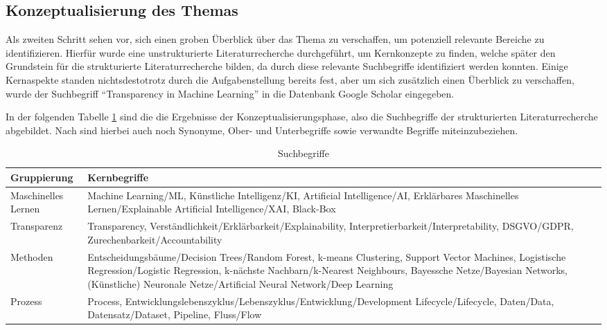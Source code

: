 \subsection{Konzeptualisierung des Themas}
\label{chap:Konzeptualisierung}
Als zweiten Schritt sehen \cite{vom_Brooke_2009} vor, sich einen groben Überblick über das Thema zu verschaffen, um potenziell relevante Bereiche zu identifizieren. Hierfür wurde eine unstrukturierte Literaturrecherche durchgeführt, um Kernkonzepte zu finden, welche später den Grundstein für die strukturierte Literaturrecherche bilden, da durch diese relevante Suchbegriffe identifiziert werden konnten. Einige Kernaspekte standen nichtsdestotrotz durch die Aufgabenstellung bereits fest, aber um sich zusätzlich einen Überblick zu verschaffen, wurde der Suchbegriff \enquote{Transparency in Machine Learning} in die Datenbank Google Scholar eingegeben. 

In der folgenden Tabelle \ref{tab:suchbegriffe} sind die die Ergebnisse der Konzeptualisierungsphase, also die Suchbegriffe der strukturierten Literaturrecherche abgebildet. Nach \cite{Brink.2013} sind hierbei auch noch Synonyme, Ober- und Unterbegriffe sowie verwandte Begriffe miteinzubeziehen.

\begin{table}[!h]
\begin{tabular}[h]{p{4cm}|p{10cm} l|l}
\large\textbf{Gruppierung} & \large\textbf{Kernbegriffe} \\
\hline
Maschinelles Lernen & Machine Learning/ML, Künstliche Intelligenz/KI, Artificial Intelligence/AI, Erklärbares Maschinelles Lernen/Explainable Artificial Intelligence/XAI, Black-Box \\
\hline
Transparenz & Transparency, Verständlichkeit/Erklärbarkeit/Explainability, Interpretierbarkeit/Interpretability, DSGVO/GDPR, Zurechenbarkeit/Accountability \\
\hline
Methoden & Entscheidungsbäume/Decision Trees/Random Forest, k-means Clustering, Support Vector Machines, Logistische Regression/Logistic Regression, k-nächste Nachbarn/k-Nearest Neighbours, Bayessche Netze/Bayesian Networks, (Künstliche) Neuronale Netze/Artificial Neural Network/Deep Learning \\
\hline
Prozess & Process, Entwicklungslebenszyklus/Lebenszyklus/Entwicklung/Development Lifecycle/Lifecycle, Daten/Data, Datensatz/Dataset, Pipeline, Fluss/Flow \\
\end{tabular}
\caption{\label{tab:suchbegriffe}Suchbegriffe}
\end{table}

